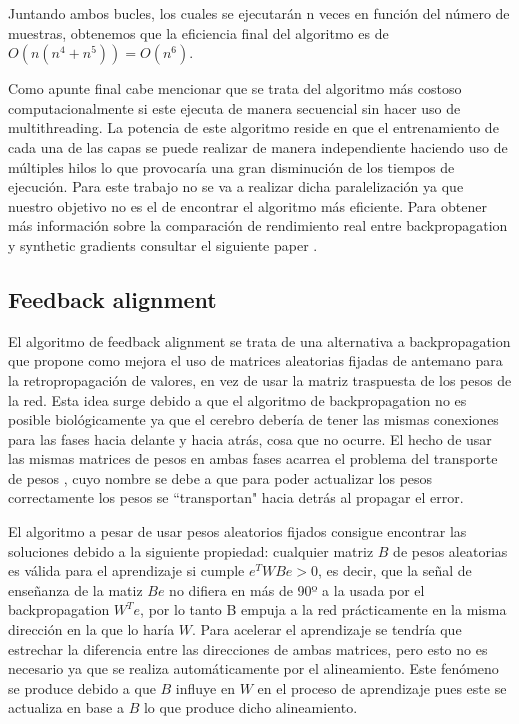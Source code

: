 Juntando ambos bucles, los cuales se ejecutarán n veces en función del número de muestras, obtenemos que la eficiencia final del algoritmo es de $O(n(n^4+n^5)) = O(n^6)$. 

Como apunte final cabe mencionar que se trata del algoritmo más costoso computacionalmente si este ejecuta de manera secuencial sin hacer uso de multithreading. La potencia de este algoritmo reside en que el entrenamiento de cada una de las capas se puede realizar de manera independiente haciendo uso de múltiples hilos lo que provocaría una gran disminución de los tiempos de ejecución. Para este trabajo no se va a realizar dicha paralelización ya que nuestro objetivo no es el de encontrar el algoritmo más eficiente. Para obtener más información sobre la comparación de rendimiento real entre backpropagation y synthetic gradients consultar el siguiente paper \cite{RefWorks:RefID:14-bisong2017benchmarking}.




\subsection{Feedback alignment}

El algoritmo de feedback alignment se trata de una alternativa a backpropagation que propone como mejora el uso de matrices aleatorias fijadas de antemano para la retropropagación de valores, en vez de usar la matriz traspuesta de los pesos de la red. Esta idea surge debido a que el algoritmo de backpropagation no es posible biológicamente ya que el cerebro debería de tener las mismas conexiones para las fases hacia delante y hacia atrás, cosa que no ocurre. El hecho de usar las mismas matrices de pesos en ambas fases acarrea el problema del transporte de pesos \cite{RefWorks:RefID:10-grossberg1987competitive}, cuyo nombre se debe a que para poder actualizar los pesos correctamente los pesos se ``transportan" hacia detrás al propagar el error. 

El algoritmo a pesar de usar pesos aleatorios fijados consigue encontrar las soluciones debido a la siguiente propiedad: cualquier matriz $B$ de pesos aleatorias es válida para el aprendizaje si cumple $e^{T}WBe>0$, es decir, que la señal de enseñanza de la matiz $Be$ no difiera en más de 90º a la usada por el backpropagation $W^{T}e$, por lo tanto B empuja a la red prácticamente en la misma dirección en la que lo haría $W$. Para acelerar el aprendizaje se tendría que estrechar la diferencia entre las direcciones de ambas matrices, pero esto no es necesario ya que se realiza automáticamente por el alineamiento. Este fenómeno se produce debido a que $B$ influye en $W$ en el proceso de aprendizaje pues este se actualiza en base a $B$ lo que produce dicho alineamiento.

